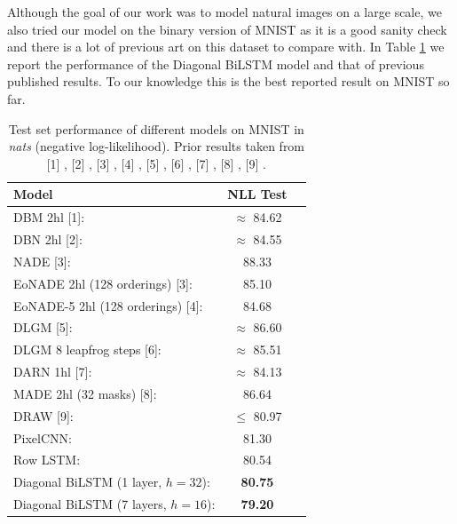 Although the goal of our work was to model natural images on a large scale, we also tried our model on the binary version \cite{salakhutdinov2008quantitative} of MNIST \cite{lecun1998gradient} as it is a good sanity check and there is a lot of previous art on this dataset to compare with. In Table \ref{table:mnist} we report the performance of the Diagonal BiLSTM model and that of previous published results. To our knowledge this is the best reported result on MNIST so far. 

\begin{table}[!h]
	\begin{center}
	\begin{tabular}{lcc}
		\toprule
		\textbf{Model} & \textbf{NLL Test}  \\ 
		\midrule
		DBM 2hl [1]: & $\approx$ 84.62 \\ 
		DBN 2hl [2]: & $\approx$ 84.55 \\ 
		NADE [3]: & 88.33 \\ 
		EoNADE 2hl (128 orderings) [3]: & 85.10 \\ 
		EoNADE-5 2hl (128 orderings) [4]: \quad \quad \quad & 84.68 \\ 
		DLGM [5]: & $\approx$ 86.60 \\ 
		DLGM 8 leapfrog steps [6]: & $\approx$ 85.51 \\ 
		DARN 1hl [7]: & $\approx$ 84.13 \\ 
		MADE 2hl (32 masks) [8]: & 86.64 \\
		DRAW [9]: & $\leq$ 80.97 \\ 
		\midrule
		PixelCNN: & 81.30 \\ 
		Row LSTM: & 80.54 \\ 
		Diagonal BiLSTM (1 layer, $h=32$): & \textbf{80.75} \\
		Diagonal BiLSTM (7 layers, $h=16$): & \textbf{79.20} \\ 
	    \bottomrule
	\end{tabular}
	\end{center}
\vspace{-0.2cm}
\caption{Test set performance of different models on MNIST in \emph{nats} (negative log-likelihood). Prior results taken from [1] \cite{salakhutdinov2009deep}, [2] \cite{murray2009evaluating}, [3] \cite{uria2013deep}, [4] \cite{raiko2014iterative}, [5] \cite{rezende2014stochastic}, [6] \cite{salimans2014markov}, [7] \cite{gregor2013deep}, [8] \cite{germain2015made}, [9] \cite{gregor2015draw}.}
\label{table:mnist}
\end{table}

